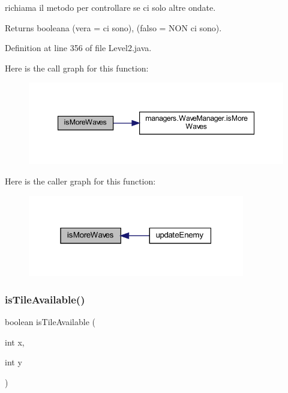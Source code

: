 richiama il metodo per controllare se ci solo altre ondate. 

\begin{DoxyReturn}{Returns}
booleana (vera = ci sono), (falso = N\+ON ci sono). 
\end{DoxyReturn}


Definition at line 356 of file Level2.\+java.

Here is the call graph for this function\+:
\nopagebreak
\begin{figure}[H]
\begin{center}
\leavevmode
\includegraphics[width=347pt]{classscenes_1_1_level2_a999f12a033f49f299ad7f55bcae24447_cgraph}
\end{center}
\end{figure}
Here is the caller graph for this function\+:\nopagebreak
\begin{figure}[H]
\begin{center}
\leavevmode
\includegraphics[width=268pt]{classscenes_1_1_level2_a999f12a033f49f299ad7f55bcae24447_icgraph}
\end{center}
\end{figure}
\mbox{\label{classscenes_1_1_level2_aaeac2ee6b3a920a21928ee7b3dc8e7a9}} 
\subsubsection{\texorpdfstring{is\+Tile\+Available()}{isTileAvailable()}}
{\footnotesize\ttfamily boolean is\+Tile\+Available (\begin{DoxyParamCaption}\item[{int}]{x,  }\item[{int}]{y }\end{DoxyParamCaption})\hspace{0.3cm}{\ttfamily [private]}}




